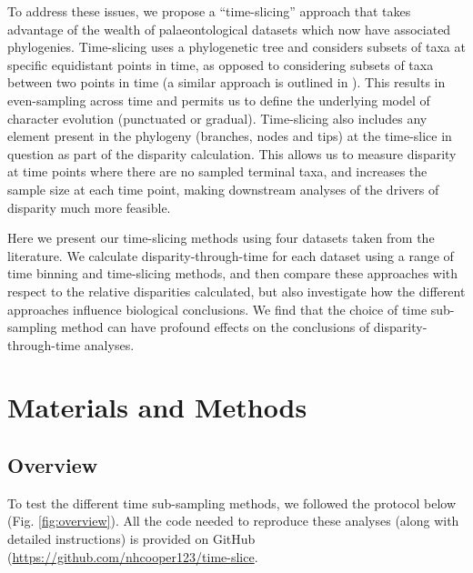 \documentclass[12pt,a4paper]{article}
\begin{document}
To address these issues, we propose a ``time-slicing'' approach that takes advantage of the wealth of palaeontological datasets which now have associated phylogenies. 
Time-slicing uses a phylogenetic tree and considers subsets of taxa at specific equidistant points in time, as opposed to considering subsets of taxa between two points in time (a similar approach is outlined in \citep{halliday2016eutherian}).
This results in even-sampling across time and permits us to define the underlying model of character evolution (punctuated or gradual).  
Time-slicing also includes any element present in the phylogeny (branches, nodes and tips) at the time-slice in question as part of the disparity calculation.
This allows us to measure disparity at time points where there are no sampled terminal taxa, and increases the sample size at each time point, making downstream analyses of the drivers of disparity much more feasible.

Here we present our time-slicing methods using four datasets taken from the literature.
We calculate disparity-through-time for each dataset using a range of time binning and time-slicing methods, and then compare these approaches with respect to the relative disparities calculated, but also investigate how the different approaches influence biological conclusions. 
We find that the choice of time sub-sampling method can have profound effects on the conclusions of disparity-through-time analyses. 

\section{Materials and Methods}
\subsection{Overview}
\label{overview-section}
To test the different time sub-sampling methods, we followed the protocol below (Fig. \ref{fig:overview}). 
All the code needed to reproduce these analyses (along with detailed instructions) is provided on GitHub (\url{https://github.com/nhcooper123/time-slice}.
\end{document}
